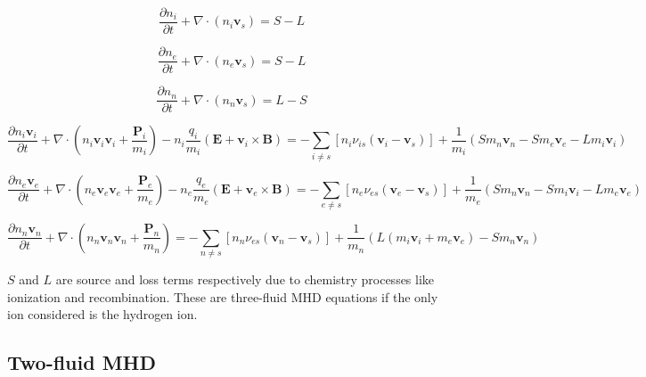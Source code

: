 \documentclass[12pt,upcase]{umlthesis}
\begin{document}
\begin{equation}\label{eq:icontinuity}
	\frac{\partial n_i}{\partial t} + \nabla \cdot (n_i \textbf{v}_s) = S - L
\end{equation}

\begin{equation}\label{eq:econtinuity}
	\frac{\partial n_e}{\partial t} + \nabla \cdot (n_e \textbf{v}_s) = S - L
\end{equation}

\begin{equation}\label{eq:econtinuity}
	\frac{\partial n_n}{\partial t} + \nabla \cdot (n_n \textbf{v}_s) = L - S
\end{equation}

\begin{equation}\label{eq:imomentum}
	\frac{\partial n_i \textbf{v}_i}{\partial t} + \nabla \cdot (n_i \textbf{v}_i \textbf{v}_i + \frac{\textbf{P}_i}{m_i} ) - n_i \frac{q_i}{m_i}(\textbf{E} + \textbf{v}_i \times \textbf{B}) = - \sum_{i \neq s} [n_i \nu_{is}(\textbf{v}_i - \textbf{v}_s)] + \frac{1}{m_i} (S m_n \textbf{v}_n - S m_e \textbf{v}_e -L m_i \textbf{v}_i)
\end{equation}

\begin{equation}\label{eq:emomentum}
	\frac{\partial n_e \textbf{v}_e}{\partial t} + \nabla \cdot (n_e \textbf{v}_e \textbf{v}_e + \frac{\textbf{P}_e}{m_e} ) - n_e \frac{q_e}{m_e}(\textbf{E} + \textbf{v}_e \times \textbf{B}) = - \sum_{e \neq s} [n_e \nu_{es}(\textbf{v}_e - \textbf{v}_s)] + \frac{1}{m_e} (S m_n \textbf{v}_n - S m_i \textbf{v}_i - L m_e \textbf{v}_e)
\end{equation}

\begin{equation}\label{eq:nmomentum}
	\frac{\partial n_n \textbf{v}_n}{\partial t} + \nabla \cdot (n_n \textbf{v}_n \textbf{v}_n + \frac{\textbf{P}_n}{m_n} ) = - \sum_{n \neq s} [n_n \nu_{es}(\textbf{v}_n - \textbf{v}_s)] + \frac{1}{m_n} (L(m_i\textbf{v}_i+m_e\textbf{v}_e) -S m_n \textbf{v}_n)
\end{equation}

$S$ and $L$ are source and loss terms respectively due to chemistry processes like ionization and recombination. These are three-fluid MHD equations if the only ion considered is the hydrogen ion.

\subsection{Two-fluid MHD}\label{sec:2fluidmhd}
\end{document}
